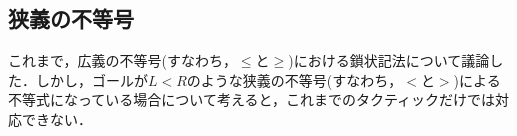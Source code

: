 \documentclass[submit]{ipsj}
\begin{document}

\subsection{狭義の不等号}

これまで，広義の不等号(すなわち，$\leq$と$\geq$)における鎖状記法について議論した．しかし，ゴールが$L < R$のような狭義の不等号(すなわち，$<$と$>$)による不等式になっている場合について考えると，これまでのタクティックだけでは対応できない．
\end{document}
